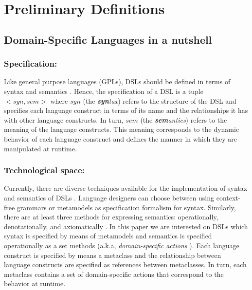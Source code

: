 \section{Preliminary Definitions}
\label{sec:background}

\subsection{Domain-Specific Languages in a nutshell}


\subsubsection{Specification:} Like general purpose languages (GPLs), DSLs should be defined in terms of syntax and semantics \cite{Harel:2004b}. Hence, the specification of a DSL is a tuple $<syn,sem>$ where $syn$ (the \textit{\textbf{syn}tax}) refers to the structure of the DSL and specifies each language construct in terms of its name and the relationships it has with other language constructs. In turn, $sem$ (the \textit{\textbf{sem}antics}) refers to the meaning of the language constructs. This meaning corresponds to the dynamic behavior of each language construct and defines the manner in which they are manipulated at runtime.

\vspace{-1mm}
\subsubsection{Technological space:} Currently, there are diverse techniques available for the implementation of syntax and semantics of DSLs \cite{Mernik:2005b}. Language designers can choose between using context-free grammars or metamodels as specification formalism for syntax. Similarly, there are at least three methods for expressing semantics: operationally, denotationally, and axiomatically \cite{Mosses:2001}. In this paper we are interested on DSLs which syntax is specified by means of metamodels and semantics is specified operationally as a set methods (a.k.a, \textit{domain-specific actions} \cite{Combemale:2013}). Each language construct is specified by means a metaclass and the relationship between language constructs are specified as references between metaclasses. In turn, each metaclass contains a set of domain-specific actions that correspond to the behavior at runtime.

